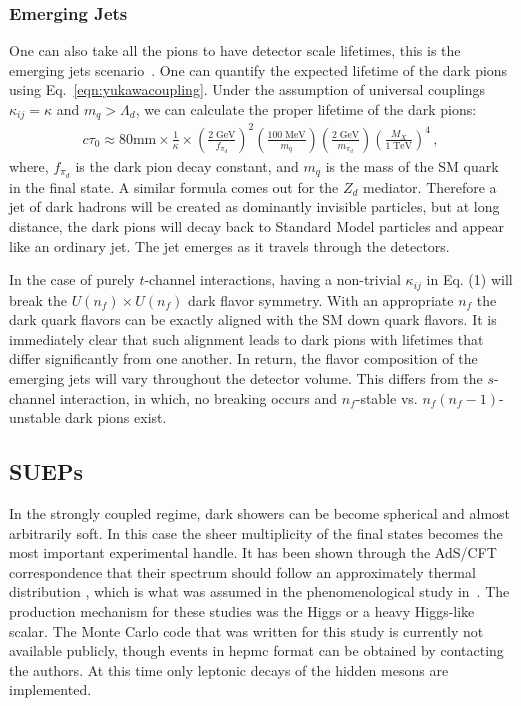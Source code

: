 \subsubsection{Emerging Jets}
One can also take all the pions to have detector scale lifetimes, this is the emerging jets scenario~\cite{Schwaller:2015gea}. One can quantify the expected lifetime of the dark pions using Eq.~\ref{eqn:yukawacoupling}.  Under the assumption of universal couplings 
$\kappa_{ij} = \kappa$ and $m_{q} > \Lambda_{d}$, we can calculate the proper lifetime of the dark pions:
%
\begin{align}
	c \tau_{0} \approx 80 \mathrm{mm} \times \frac{1}{\kappa} \times \left( \frac{2 \;\mathrm{GeV}}{f_{\pi_{d}}} \right)^2 \left( \frac{100 \;\mathrm{MeV}}{m_{q}} \right) \left( \frac{2\; \mathrm{GeV}}{m_{\pi_{d} }} \right) \left( \frac{M_{X}}{1 \;\mathrm{TeV}} \right)^4 \,,
\end{align} 
where, $f_{\pi_{d}}$ is the dark pion decay constant, and $m_q$ is the mass of the SM quark in the final state.  A similar formula comes out for the $Z_d$ mediator. Therefore a jet of dark hadrons will be created as dominantly invisible particles, but at long distance, the dark pions will decay back to Standard Model particles and appear like an ordinary jet. The jet emerges as it travels through the detectors.


In the case of purely $t$-channel interactions, having a non-trivial $\kappa_{ij}$ in Eq. (1) will break the $U(n_{f}) \times U(n_{f})$ dark flavor symmetry. With an appropriate $n_{f}$ the dark quark flavors can be exactly aligned with the SM down quark flavors. It is immediately clear that such alignment leads to dark pions with lifetimes that differ significantly
from one another. In return, the flavor composition of the emerging jets will vary throughout the detector volume. This differs from the $s$-channel interaction, in which, no breaking occurs and $n_{f}$-stable vs. $n_{f}(n_{f} - 1)$-unstable dark pions exist. 

\subsection{SUEPs}
In the strongly coupled regime, dark showers can be become spherical and almost arbitrarily soft. In this case the sheer multiplicity of the final states becomes the most important experimental handle. It has been shown through the AdS/CFT correspondence that their spectrum should follow an approximately thermal distribution \cite{Hatta:2008qx}, which is what was assumed in the phenomenological study in~\cite{Knapen:2016hky}. The production mechanism for these studies was the Higgs or a heavy Higgs-like scalar. The Monte Carlo code that was written for this study is currently not available publicly, though events in hepmc format can be obtained by contacting the authors. At this time only leptonic decays of the hidden mesons are implemented.  




